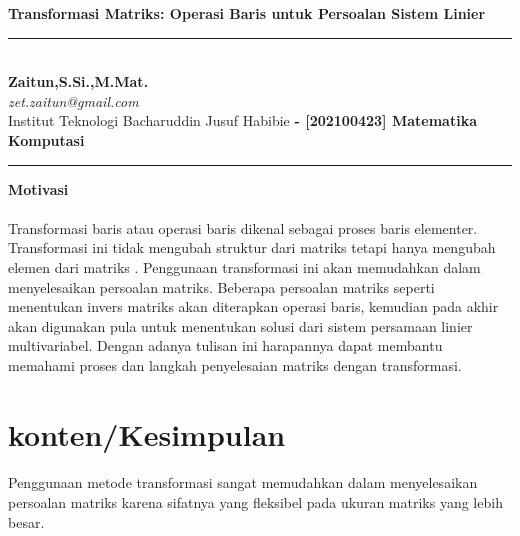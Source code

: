 \documentclass{article}   %
\newcommand{\judul}{Transformasi Matriks: Operasi Baris untuk Persoalan Sistem Linier}
\newcommand{\nama}{Zaitun}
\newcommand{\matkul}{[202100423] Matematika Komputasi}
\newcommand{\asosiasi}{Institut Teknologi Bacharuddin Jusuf Habibie}
\begin{document}
\thispagestyle{empty}
\begin{center}
    \vspace{.4cm}
    \textsf{\textbf { \large \judul}}
\end{center}
\vspace{.4cm}
\hrule
	\textsf{\\
		\textbf{\nama,S.Si.,M.Mat.} \hspace{\fill}
		\textit{\large }\\ [0.7ex]
		\textit{zet.zaitun@gmail.com} \hspace{\fill} \textbf{}\\ [0.7ex]
		\asosiasi \hspace{\fill} \textbf{- \matkul }} \\
	\hrule
\vspace{.4cm}
\begin{center}
\textbf{\Large Motivasi}
\end{center}
\paragraph*{} 
Transformasi baris atau operasi baris dikenal sebagai proses baris elementer. Transformasi ini tidak mengubah struktur dari matriks tetapi hanya mengubah elemen dari matriks \textbf{\cite{zz}}. Penggunaan transformasi ini akan memudahkan dalam menyelesaikan persoalan matriks. Beberapa persoalan matriks seperti menentukan invers matriks akan diterapkan operasi baris, kemudian pada akhir akan digunakan pula untuk menentukan solusi dari sistem persamaan linier multivariabel. Dengan adanya tulisan ini harapannya dapat membantu memahami proses dan langkah penyelesaian matriks dengan transformasi.




\section{konten/Kesimpulan}
\paragraph*{} Penggunaan metode transformasi sangat memudahkan dalam menyelesaikan persoalan matriks karena sifatnya yang fleksibel pada ukuran matriks yang lebih besar. 



\end{document}

